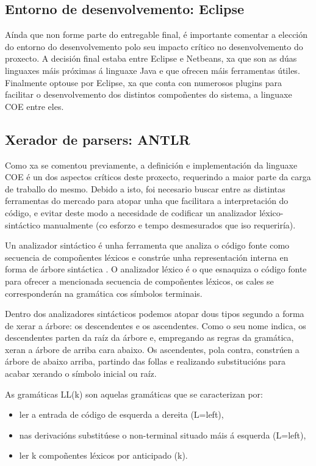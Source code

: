 \subsection{Entorno de desenvolvemento: Eclipse}
Aínda que non forme parte do entregable final, é importante comentar a elección
do entorno do desenvolvemento polo seu impacto crítico no desenvolvemento do
proxecto. A decisión final estaba entre Eclipse e Netbeans, xa que son as dúas
linguaxes máis próximas á linguaxe Java e que ofrecen máis ferramentas útiles.
Finalmente optouse por Eclipse, xa que conta con numerosos plugins para
facilitar o desenvolvemento dos distintos compoñentes do sistema, a linguaxe
COE entre eles.

\subsection{Xerador de parsers: ANTLR}
Como xa se comentou previamente, a definición e implementación da linguaxe COE é
un dos aspectos críticos deste proxecto, requerindo a maior parte da carga de
traballo do mesmo. Debido a isto, foi necesario buscar entre as distintas
ferramentas do mercado para atopar unha que facilitara a interpretación do
código, e evitar deste modo a necesidade de codificar un analizador
léxico-sintáctico manualmente (co esforzo e tempo desmesurados que iso
requeriría).
\par
Un analizador sintáctico é unha ferramenta que analiza o código fonte como
secuencia de compoñentes léxicos e constrúe unha representación interna en forma
de árbore sintáctica \cite{compiladores}. O analizador léxico é o que
esnaquiza o código fonte para ofrecer a mencionada secuencia de compoñentes
léxicos, os cales se corresponderán na gramática cos símbolos terminais.
\par
Dentro dos analizadores sintácticos podemos atopar dous tipos segundo a forma
de xerar a árbore: os descendentes e os ascendentes. Como o seu nome indica, os
descendentes parten da raíz da árbore e, empregando as regras da gramática,
xeran a árbore de arriba cara abaixo. Os ascendentes, pola contra, constrúen a
árbore de abaixo arriba, partindo das follas e realizando substitucións para
acabar xerando o símbolo inicial ou raíz.
\par
As gramáticas LL(k) son aquelas gramáticas que se caracterizan por:
\begin{itemize}
  \item ler a entrada de código de esquerda a dereita (L=left),
  \item nas derivacións substitúese o non-terminal situado máis á esquerda (L=left),
  \item ler k compoñentes léxicos por anticipado (k).
\end{itemize}
